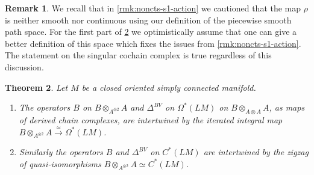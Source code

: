 \documentclass{scrartcl}
\theoremstyle{plain}
\newtheorem{theorem}{Theorem}[section]
\theoremstyle{definition}
\newtheorem{remark}[theorem]{Remark}
\newcommand{\quiso}{\simeq}
\let\xto\xrightarrow
\begin{document}
\begin{remark}
    We recall that in \cref{rmk:noncts-s1-action} we cautioned that the map $\rho$ is neither smooth nor continuous using our definition of the piecewise smooth path space. For the first part of \cref{thm:bv-iso} we optimistically assume that one can give a better definition of this space which fixes the issues from \cref{rmk:noncts-s1-action}. The statement on the singular cochain complex is true regardless of this discussion. 
\end{remark}

\begin{theorem}\label{thm:bv-iso}
    Let $M$ be a closed oriented simply connected manifold.
    \begin{enumerate}
    \item The operators $B$ on $B\otimes_{A^{\otimes 2}} A$ and $\Delta^{BV}$ on $\Omega^*(LM)$ on $B\otimes_{A\otimes A} A$, as maps of derived chain complexes, are intertwined  by the iterated integral map $B\otimes_{A^{\otimes 2}} A \xto{\quiso}\Omega^*(LM)$. 
    \item Similarly the operators $B$ and $\Delta^{BV}$ on $C^*(LM)$ are intertwined by the zigzag of quasi-isomorphisms $B\otimes_{A^{\otimes 2}} A \quiso C^*(LM)$. 
    \end{enumerate}
\end{theorem}
\end{document}
